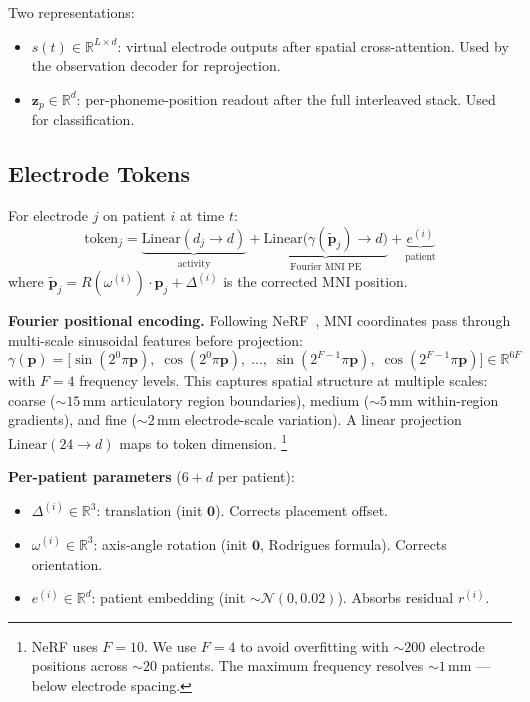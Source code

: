 \documentclass[11pt,letterpaper]{article}
\newcommand{\bfp}{\mathbf{p}}
\newcommand{\bfz}{\mathbf{z}}
\newcommand{\R}{\mathbb{R}}
\begin{document}
Two representations:
\begin{itemize}[leftmargin=2em]
\item $s(t) \in \R^{L \times d}$: virtual electrode outputs after spatial cross-attention. Used by the observation decoder for reprojection.
\item $\bfz_p \in \R^d$: per-phoneme-position readout after the full interleaved stack. Used for classification.
\end{itemize}


\subsection{Electrode Tokens}\label{sec:tokens}

For electrode $j$ on patient $i$ at time $t$:
\begin{equation}
\text{token}_j = \underbrace{\text{Linear}(d_j \to d)}_{\text{activity}} + \underbrace{\text{Linear}\bigl(\gamma(\tilde{\bfp}_j) \to d\bigr)}_{\text{Fourier MNI PE}} + \underbrace{e^{(i)}}_{\text{patient}}
\end{equation}
where $\tilde{\bfp}_j = R(\omega^{(i)}) \cdot \bfp_j + \Delta^{(i)}$ is the corrected MNI position.

\textbf{Fourier positional encoding.} Following NeRF~\cite{mildenhall2020}, MNI coordinates pass through multi-scale sinusoidal features before projection:
\begin{equation}
\gamma(\bfp) = \bigl[\sin(2^0 \pi \bfp),\; \cos(2^0 \pi \bfp),\; \ldots,\; \sin(2^{F-1} \pi \bfp),\; \cos(2^{F-1} \pi \bfp)\bigr] \in \R^{6F}
\end{equation}
with $F{=}4$ frequency levels. This captures spatial structure at multiple scales: coarse (${\sim}15$\,mm articulatory region boundaries), medium (${\sim}5$\,mm within-region gradients), and fine (${\sim}2$\,mm electrode-scale variation). A linear projection $\text{Linear}(24 \to d)$ maps to token dimension.%
\footnote{NeRF uses $F{=}10$. We use $F{=}4$ to avoid overfitting with ${\sim}200$ electrode positions across ${\sim}20$ patients. The maximum frequency resolves ${\sim}1$\,mm --- below electrode spacing.}

\textbf{Per-patient parameters} ($6 + d$ per patient):
\begin{itemize}[leftmargin=2em]
\item $\Delta^{(i)} \in \R^3$: translation (init $\mathbf{0}$). Corrects placement offset.
\item $\omega^{(i)} \in \R^3$: axis-angle rotation (init $\mathbf{0}$, Rodrigues formula). Corrects orientation.
\item $e^{(i)} \in \R^d$: patient embedding (init $\sim \mathcal{N}(0, 0.02)$). Absorbs residual $r^{(i)}$.
\end{itemize}
\end{document}
